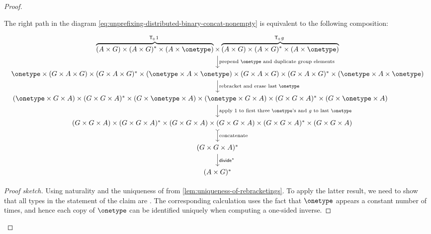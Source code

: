 \begin{proof}
\begin{claim}\label{claim:right-path-in-binary-unprefixing-distributes-over-concat}
    The right path in the diagram \eqref{eq:unprefixing-distributed-binary-concat-nonempty} is equivalent to the following composition:
    \[
\begin{tikzcd}
\myoverbrace{(A \times G) \times (A \times G)^* \times (A \times \onetype)}{$\functorplus \groupid$} \times 
\myoverbrace{
(A \times G) \times (A \times G)^* \times (A \times \onetype)}{$ \functorplus g$}
\ar[d,"\text{prepend $\onetype$ and duplicate group elements}"]
\\
\onetype \times (G \times A \times G) \times (G \times A \times G)^* \times (\onetype \times A \times \onetype) \times (G \times A \times G) \times (G \times A \times G)^* \times (\onetype \times A \times \onetype)
\ar[d,"\text{rebracket and erase last $\onetype$}"]
\\
(\onetype \times G \times A) \times (G \times G \times A)^* \times (G  \times \onetype  \times A) \times (\onetype \times G \times A) \times (G \times G \times A)^* \times (G \times \onetype \times A)\phantom{\times \onetype}
\ar[d,"\text{apply $\groupid$ to first three $\onetype$'s and $g$ to last  $\onetype$}"]
\\
(G \times G \times A) \times (G \times G \times A)^* \times (G  \times G  \times A) \times (G \times G \times A) \times (G \times G \times A)^* \times (G \times G \times A)
\phantom{ \times G} 
\ar[d,\concar,"\text{concatenate}"]
\\
( G \times G \times A)^* 
\ar[d,"\groupdiv^*"]
\\
(A \times G)^*
\end{tikzcd}
\]
\end{claim}
\begin{proof}[Proof sketch]
    Using naturality and the uniqueness of  from \cref{lem:uniqueness-of-rebracketings}. To apply the latter result, we need to show that all types in the statement of the claim are . The corresponding calculation uses the fact that $\onetype$ appears a constant number of times, and hence each copy of $\onetype$ can be identified uniquely when computing a one-sided inverse.
\end{proof}


\end{proof}
